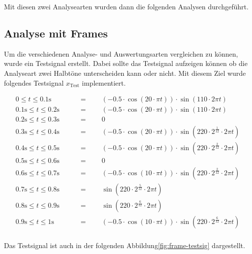 Mit diesen zwei Analysearten wurden dann die folgenden Analysen durchgeführt.
\newpage

\subsection{Analyse mit Frames}

Um die verschiedenen Analyse- und Auswertungsarten vergleichen zu können, wurde ein Testsignal erstellt. Dabei sollte das Testsignal aufzeigen können ob die Analyseart zwei Halbtöne unterscheiden kann oder nicht. Mit diesem Ziel wurde folgendes Testsignal $x_{\text{Test}}$ implementiert.

\begin{loesung}
	\begin{align*}
	0 \leq t \leq 0.1\text{s} \qquad			& = \qquad (-0.5\cdot \cos(20\cdot\pi t))\cdot \sin(110\cdot 2\pi t) \\
	0.1\text{s} \leq t \leq 0.2\text{s}\qquad	& = \qquad (-0.5\cdot \cos(20\cdot\pi t))\cdot \sin(110\cdot 2\pi t) \\
	0.2\text{s} \leq t \leq 0.3\text{s}\qquad	& = \qquad 0\\
	0.3\text{s} \leq t \leq 0.4\text{s}\qquad	& = \qquad (-0.5\cdot \cos(20\cdot\pi t))\cdot \sin(220\cdot  2^{\frac{1}{12}}\cdot 2\pi t) \\
	0.4\text{s} \leq t \leq 0.5\text{s}\qquad	& = \qquad (-0.5\cdot \cos(20\cdot\pi t))\cdot \sin(220\cdot2^{\frac{2}{12}}\cdot 2\pi t) \\
	0.5\text{s} \leq t \leq 0.6\text{s}\qquad	& = \qquad 0 \\
	0.6\text{s} \leq t \leq 0.7\text{s}\qquad	& = \qquad (-0.5\cdot \cos(10\cdot\pi t))\cdot \sin(220\cdot2^{\frac{2}{12}}\cdot 2\pi t) \\
	0.7\text{s} \leq t \leq 0.8\text{s}\qquad	& = \qquad \sin(220\cdot2^{\frac{5}{12}}\cdot 2\pi t) \\
	0.8\text{s} \leq t \leq 0.9\text{s}\qquad	& = \qquad \sin(220\cdot2^{\frac{6}{12}}\cdot 2\pi t) \\
	0.9\text{s} \leq t \leq 1\text{s}\qquad		& = \qquad (-0.5\cdot \cos(10\cdot\pi t))\cdot \sin(220\cdot2^{\frac{6}{12}}\cdot 2\pi t) \\
	\end{align*}
\end{loesung}
Das Testsignal ist auch in der folgenden Abbildung\ref{fig:frame-testsig} dargestellt.
